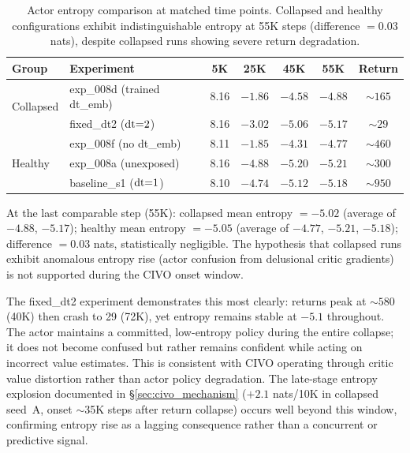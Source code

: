 \begin{table}[h]
\centering
\caption{Actor entropy comparison at matched time points. Collapsed and healthy configurations exhibit indistinguishable entropy at 55K steps (difference $= 0.03$ nats), despite collapsed runs showing severe return degradation.}
\label{tab:entropy_contrast}
\footnotesize
\setlength{\tabcolsep}{4pt}
\begin{tabular}{llccccc}
\toprule
\textbf{Group} & \textbf{Experiment} & \textbf{5K} & \textbf{25K} & \textbf{45K} & \textbf{55K} & \textbf{Return} \\
\midrule
\multirow{2}{*}{Collapsed}
 & exp\_008d (trained dt\_emb) & 8.16 & $-1.86$ & $-4.58$ & $-4.88$ & ${\sim}165$ \\
 & fixed\_dt2 ($\mathrm{dt}{=}2$) & 8.16 & $-3.02$ & $-5.06$ & $-5.17$ & ${\sim}29$ \\
\midrule
\multirow{3}{*}{Healthy}
 & exp\_008f (no dt\_emb) & 8.11 & $-1.85$ & $-4.31$ & $-4.77$ & ${\sim}460$ \\
 & exp\_008a (unexposed) & 8.16 & $-4.88$ & $-5.20$ & $-5.21$ & ${\sim}300$ \\
 & baseline\_s1 ($\mathrm{dt}{=}1$) & 8.10 & $-4.74$ & $-5.12$ & $-5.18$ & ${\sim}950$ \\
\bottomrule
\end{tabular}
\end{table}

At the last comparable step (55K): collapsed mean entropy $= -5.02$ (average of $-4.88$, $-5.17$); healthy mean entropy $= -5.05$ (average of $-4.77$, $-5.21$, $-5.18$); difference $= 0.03$ nats, statistically negligible. The hypothesis that collapsed runs exhibit anomalous entropy rise (actor confusion from delusional critic gradients) is not supported during the CIVO onset window.

The fixed\_dt2 experiment demonstrates this most clearly: returns peak at ${\sim}580$ (40K) then crash to 29 (72K), yet entropy remains stable at $-5.1$ throughout. The actor maintains a committed, low-entropy policy during the entire collapse; it does not become confused but rather remains confident while acting on incorrect value estimates. This is consistent with CIVO operating through critic value distortion rather than actor policy degradation. The late-stage entropy explosion documented in \S\ref{sec:civo_mechanism} ($+2.1$ nats/10K in collapsed seed~A, onset ${\sim}$35K steps after return collapse) occurs well beyond this window, confirming entropy rise as a lagging consequence rather than a concurrent or predictive signal.


